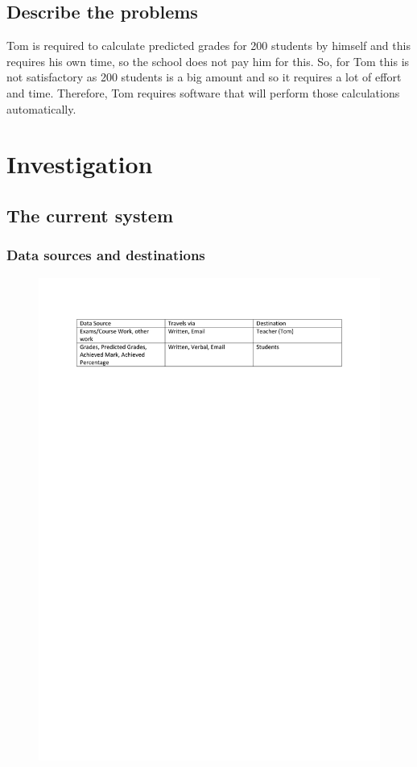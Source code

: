 \subsection{Describe the problems}

Tom is required to calculate predicted grades for 200 students by himself and this requires his own time, so the school does not pay him for this. So, for Tom this is not satisfactory as 200 students is a big amount and so it requires a lot of effort and time. Therefore, Tom requires software that will perform those calculations automatically. 

\section{Investigation}

\subsection{The current system}
\subsubsection{Data sources and destinations}

\begin{figure}[H]
    \includegraphics[width=\textwidth]{./Analysis/images/DataSourcesandDestinations.pdf}
\end{figure}


